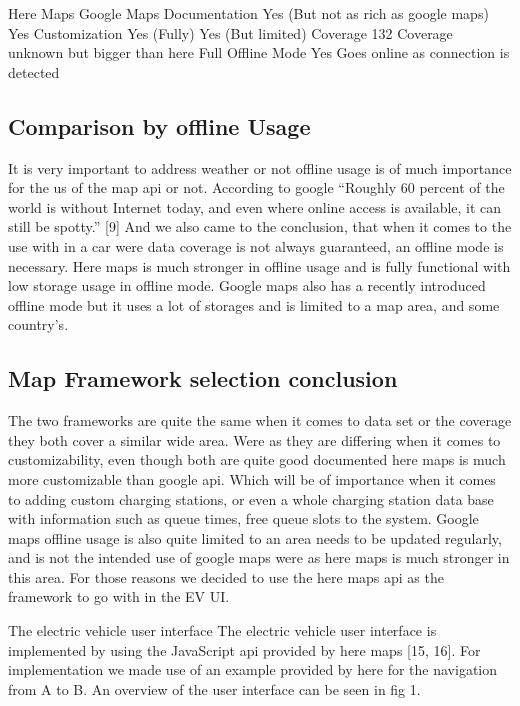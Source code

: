 Here Maps
Google Maps
Documentation
Yes (But not as rich as google maps)
Yes
Customization
Yes (Fully)
Yes (But limited)
Coverage
132
Coverage unknown but bigger than here
Full Offline Mode
Yes
Goes online as connection is detected

\subsection{Comparison by offline Usage}

It is very important to address weather or not offline usage is of much importance for the us of the map api or not. According to google “Roughly 60 percent of the world is without Internet today, and even where online access is available, it can still be spotty.” [9] And we also came to the conclusion, that when it comes to the use with in a car were data coverage is not always guaranteed, an offline mode is necessary. Here maps is much stronger in offline usage and is fully functional with low storage usage in offline mode. Google maps also has a recently introduced offline mode but it uses a lot of storages and is limited to a map area, and some country’s. 

\subsection{Map Framework selection conclusion}

The two frameworks are quite the same when it comes to data set or the coverage they both cover a similar wide area. Were as they are differing when it comes to customizability, even though both are quite good documented here maps is much more customizable than google api. Which will be of importance when it comes to adding custom charging stations, or even a whole charging station data base with information such as queue times, free queue slots to the system. Google maps offline usage is also quite limited to an area needs to be updated regularly, and is not the intended use of google maps were as here maps is much stronger in this area. For those reasons we decided to use the here maps api as the framework to go with in the EV UI.  





The electric vehicle user interface 
The electric vehicle user interface is implemented by using the JavaScript api provided by here maps [15, 16]. For implementation we made use of an example provided by here for the navigation from A to B. An overview of the user interface can be seen in fig 1. 

